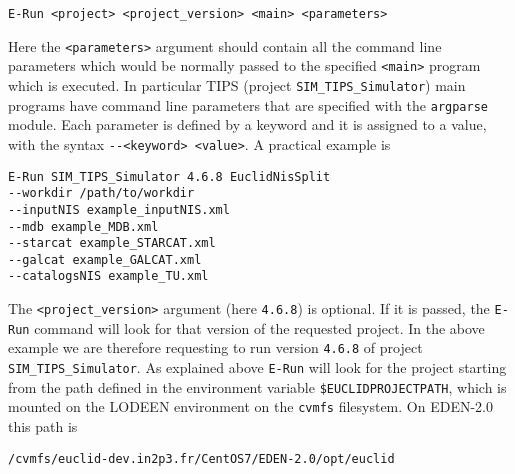 \begin{center}
\verb+E-Run <project> <project_version> <main> <parameters>+
\end{center}

Here the \verb+<parameters>+ argument should contain all the command line parameters which would be normally passed to the specified \verb+<main>+ program which is executed. In particular TIPS (project \verb+SIM_TIPS_Simulator+) main programs have command line parameters that are specified with the \verb+argparse+ module. Each parameter is defined by a keyword and it is assigned to a value, with the syntax \verb+--<keyword> <value>+. A practical example is

\begin{verbatim}
E-Run SIM_TIPS_Simulator 4.6.8 EuclidNisSplit
--workdir /path/to/workdir 
--inputNIS example_inputNIS.xml 
--mdb example_MDB.xml 
--starcat example_STARCAT.xml
--galcat example_GALCAT.xml  
--catalogsNIS example_TU.xml
\end{verbatim}

The \verb+<project_version>+ argument (here \verb+4.6.8+) is optional. If it is passed, the \verb+E-Run+ command will look for that version of the requested project. In the above example we are therefore requesting to run version \verb+4.6.8+ of project \verb+SIM_TIPS_Simulator+. As explained above \verb+E-Run+ will look for the project starting from the path defined in the environment variable \verb+$EUCLIDPROJECTPATH+, which is mounted on the LODEEN environment on the \verb+cvmfs+ filesystem. On EDEN-2.0 this path is

\begin{verbatim}
/cvmfs/euclid-dev.in2p3.fr/CentOS7/EDEN-2.0/opt/euclid
\end{verbatim}